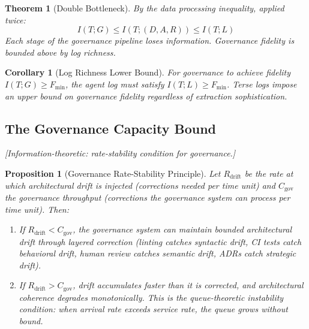 \documentclass[11pt, a4paper, logo, copyright]{googledeepmind}
\newtheorem{theorem}{Theorem}[section]
\newtheorem{proposition}{Proposition}[section]
\newtheorem{corollary}{Corollary}[section]
\begin{document}
\begin{theorem}[Double Bottleneck]
\label{thm:double-bottleneck}
By the data processing inequality, applied twice:
\begin{equation}
    I(T; G) \leq I(T; (D, A, R)) \leq I(T; L)
\end{equation}
Each stage of the governance pipeline loses information. Governance fidelity is bounded above by log richness.
\end{theorem}

\begin{corollary}[Log Richness Lower Bound]
For governance to achieve fidelity $I(T; G) \geq F_{\min}$, the agent log must satisfy $I(T; L) \geq F_{\min}$. Terse logs impose an upper bound on governance fidelity regardless of extraction sophistication.
\end{corollary}

\subsection{The Governance Capacity Bound}
\emph{[Information-theoretic: rate-stability condition for governance.]}

\begin{proposition}[Governance Rate-Stability Principle]
\label{thm:governance-capacity}
Let $R_{\text{drift}}$ be the rate at which architectural drift is injected (corrections needed per time unit) and $C_{\text{gov}}$ the governance throughput (corrections the governance system can process per time unit). Then:
\begin{enumerate}
    \item If $R_{\text{drift}} < C_{\text{gov}}$, the governance system can maintain bounded architectural drift through layered correction (linting catches syntactic drift, CI tests catch behavioral drift, human review catches semantic drift, ADRs catch strategic drift).
    \item If $R_{\text{drift}} > C_{\text{gov}}$, drift accumulates faster than it is corrected, and architectural coherence degrades monotonically. This is the queue-theoretic instability condition: when arrival rate exceeds service rate, the queue grows without bound.
\end{enumerate}
\end{proposition}
\end{document}
